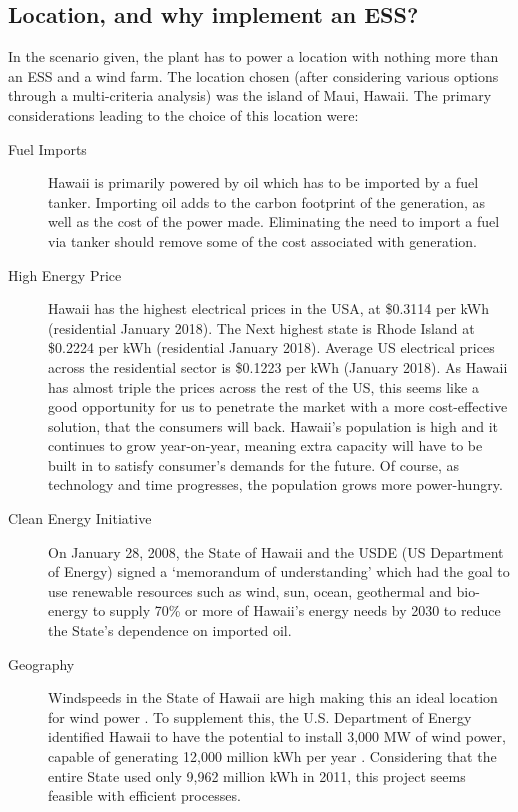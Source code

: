 \subsection{Location, and why implement an ESS?}
In the scenario given, the plant has to power a location with nothing more than an ESS and a wind farm.
The location chosen (after considering various options through a multi-criteria analysis) was the island of Maui, Hawaii.
The primary considerations leading to the choice of this location were:
\begin{description}
        \item[Fuel Imports]{Hawaii is primarily powered by oil \cite{intro:oilimport} which has to be imported by a fuel tanker. Importing oil adds to the carbon footprint of the generation, as well as the cost of the power made. Eliminating the need to import a fuel via tanker should remove some of the cost associated with generation.}
        \item[High Energy Price]{Hawaii has the highest electrical prices in the USA, at \$0.3114 per kWh (residential January 2018)\cite{intro:price}. The Next highest state is Rhode Island at \$0.2224 per kWh (residential January 2018)\cite{intro:price}. Average US electrical prices across the residential sector is \$0.1223 per kWh (January 2018)\cite{intro:price}. As Hawaii has almost triple the prices across the rest of the US, this seems like a good opportunity for us to penetrate the market with a more cost-effective solution, that the consumers will back.
Hawaii's population is high and it continues to grow year-on-year, meaning extra capacity will have to be built in to satisfy consumer's demands for the future. Of course, as technology and time progresses, the population grows more power-hungry.}
        \item[Clean Energy Initiative]{On January 28, 2008, the State of Hawaii and the USDE (US Department of Energy) signed a `memorandum of understanding' which had the goal to use renewable resources such as wind, sun, ocean, geothermal and bio-energy to supply 70\% or more of Hawaii's energy needs by 2030 to reduce the State's dependence on imported oil.}
        \item[Geography]{Windspeeds in the State of Hawaii are high making this an ideal location for wind power \cite{intro:windspeed}. To supplement this, the U.S. Department of Energy identified Hawaii to have the potential to install 3,000 MW of wind power, capable of generating 12,000 million kWh per year \cite{intro:energy}.
Considering that the entire State used only 9,962 million kWh in 2011, this project seems feasible with efficient processes.}
\end{description}


